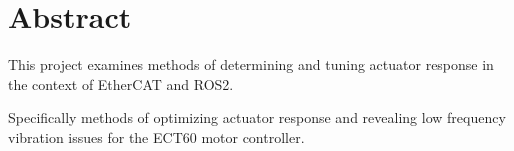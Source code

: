 \section*{Abstract}

This project examines methods of determining and tuning actuator response in the context of EtherCAT and ROS2. 

Specifically methods of optimizing actuator response and revealing low frequency vibration issues for the ECT60 motor controller.
